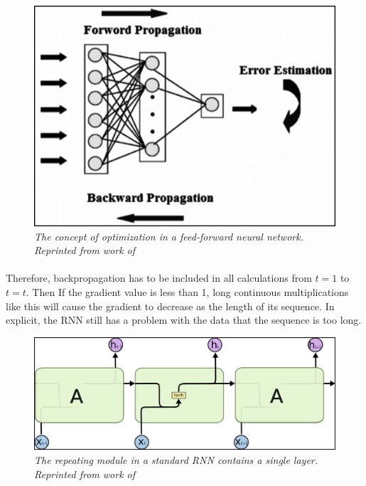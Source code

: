 \begin{figure}[H]
  \centering
  \caption[The concept of optimization in a feed-forward neural network.]{\emph{The concept of optimization in a feed-forward neural network. \\Reprinted from work of \citeauthor{donges_2019} \citeyear{donges_2019}}}\label{fig:bpp}
  \includegraphics[scale = 0.4]{figures/bpp.jpg}  
\end{figure}

\paragraph{}
Therefore, backpropagation has to be included in all calculations from $t=1$ to $t=t$. Then If the gradient value is less than 1, long continuous multiplications like this will cause the gradient to decrease as the length of its sequence. In explicit, the RNN still has a problem with the data that the sequence is too long.

\begin{figure}[H]
  \centering
  \caption[The repeating module in a standard RNN contains a single layer.]{\emph{The repeating module in a standard RNN contains a single layer. \\Reprinted from work of \citeauthor{olah_2015} \citeyear{olah_2015}}}\label{fig:RNN_2}
  \includegraphics[scale = 0.2]{figures/RNN_2.jpg}  
\end{figure}

